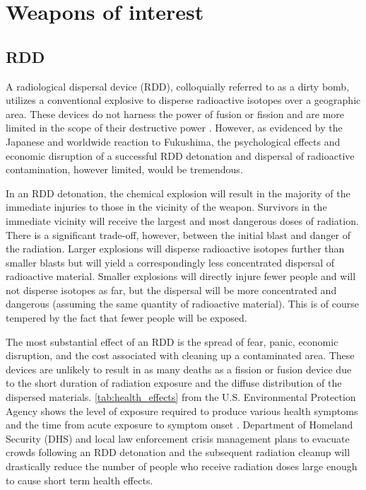 \documentclass{report}
\begin{document}
\section{Weapons  of interest}

\subsection{RDD} \label{sec:RDD}

A radiological dispersal device (RDD), colloquially referred to as a dirty bomb, utilizes a conventional explosive to disperse radioactive isotopes over a geographic area. These devices do not harness the power of fusion or fission and are more limited in the scope of their destructive power \cite{Renewal2011}.  However, as evidenced by the Japanese and worldwide reaction to Fukushima, the psychological effects and economic disruption of a successful RDD detonation and dispersal of radioactive contamination, however limited, would be tremendous.
 
In an RDD detonation, the chemical explosion will result in the majority of the immediate injuries to those in the  vicinity of the weapon. Survivors in the immediate vicinity will receive the largest and most dangerous doses of radiation. There is a significant trade-off, however, between the initial blast and danger of the radiation. Larger explosions will disperse radioactive isotopes  further than smaller blasts but will yield a correspondingly less concentrated dispersal of radioactive material. Smaller explosions will directly injure fewer people and will not disperse isotopes as far,  but the dispersal will be more concentrated and dangerous (assuming the same quantity of radioactive material). This is of course tempered by the fact that fewer people will be exposed.

The most substantial effect of an RDD is the spread of fear, panic, economic disruption, and the cost associated with cleaning up a contaminated area. These devices are unlikely to result in as many deaths as a fission or fusion device due to the short duration of radiation exposure and the diffuse distribution of the dispersed materials. \autoref{tab:health_effects} from the U.S. Environmental Protection Agency shows the level of exposure required to produce various health symptoms and the time from acute exposure to symptom onset \cite{USEPA1999}. Department of Homeland Security (DHS) and local law enforcement crisis management plans to evacuate crowds following an RDD detonation and the subsequent radiation cleanup will drastically reduce the number of people who receive radiation doses large enough to cause short term health effects.
\end{document}
